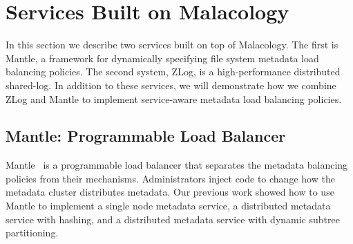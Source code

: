 \section{Services Built on Malacology}
\label{sec:services}
\label{services-built-on-malacology}

\label{services}

In this section we describe two services built on top of Malacology. The first
is Mantle, a framework for dynamically specifying file system metadata load
balancing policies. The second system, ZLog, is a high-performance distributed
shared-log.  In addition to these services, we will demonstrate how we combine
ZLog and Mantle to implement service-aware metadata load balancing policies.

\subsection{Mantle: Programmable Load Balancer}
\label{sec:mantle}

Mantle~\cite{sevilla:sc15-mantle} is a programmable load balancer that
separates the metadata balancing policies from their mechanisms. Administrators
inject code to change how the metadata cluster distributes metadata. Our
previous work showed how to use Mantle to implement a single node metadata
service, a distributed metadata service with hashing, and a distributed
metadata service with dynamic subtree partitioning. 

